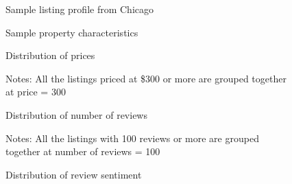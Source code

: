 \singlespacing

\begin{figure}[h]
	\caption{Sample listing profile from Chicago}
	\label{fig:listing}
\end{figure}
\begin{figure}
	\caption{Sample property characteristics}
	\label{fig:property}
\end{figure}

\begin{figure}\centering
	\caption{Distribution of prices}
	\caption*{Notes: All the listings priced at \$300 or more are grouped together at price = 300}
	\label{fig:prices}
\end{figure}

\begin{figure}\centering
	\caption{Distribution of number of reviews}
	\caption*{Notes: All the listings with 100 reviews or more are grouped together at number of reviews = 100}
	\label{fig:reviews}
\end{figure}

\begin{figure}\centering
	\caption{Distribution of review sentiment}
	\label{fig:sentiment}
\end{figure}



% 









